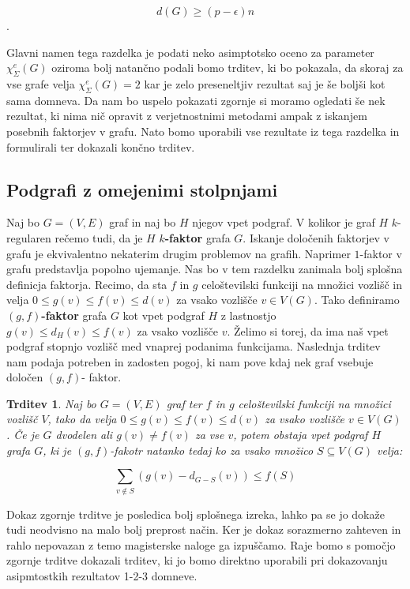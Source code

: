 \documentclass[12pt,a4paper,twoside]{article}
\theoremstyle{definition} %
\theoremstyle{plain} %
\newtheorem{trditev}[definicija]{Trditev}
\newcommand{\ec}{\chi_{\Sigma}^e}
\numberwithin{equation}{section}  %
\begin{document}
$$ d(G) \ge (p - \epsilon)n $$.

Glavni namen tega razdelka je podati neko asimptotsko oceno za parameter $\ec(G)$ oziroma bolj natančno podali bomo trditev, ki bo pokazala, da skoraj za vse grafe velja $\ec(G) = 2$ kar je zelo preseneltjiv rezultat saj je še boljši kot sama domneva. Da nam bo uspelo pokazati zgornje si moramo ogledati še nek rezultat, ki nima nič opravit z verjetnostnimi metodami ampak z iskanjem posebnih faktorjev v grafu. Nato bomo uporabili vse rezultate iz tega razdelka in formulirali ter dokazali končno trditev.

\subsection{Podgrafi z omejenimi stolpnjami}

Naj bo $G =(V, E)$ graf in naj bo $H$ njegov vpet podgraf. V kolikor je graf $H$ $k$-regularen rečemo tudi, da je $H$ \textbf{$k$-faktor} grafa $G$.  Iskanje določenih faktorjev v grafu je ekvivalentno nekaterim drugim problemov na grafih. Naprimer $1$-faktor v grafu predstavlja popolno ujemanje. Nas bo v tem razdelku zanimala bolj splošna definicja faktorja.  Recimo, da sta $f$ in $g$ celoštevilski funkciji na množici vozlišč in velja $0 \le g(v) \le f(v) \le d(v)$ za vsako vozlišče $v \in V(G)$. Tako definiramo \textbf{$(g,f)$-faktor} grafa $G$ kot vpet podgraf $H$ z lastnostjo $g(v) \le d_H(v) \le f(v)$ za vsako vozlišče $v$. Želimo si torej, da ima naš vpet podgraf stopnjo vozlišč med vnaprej podanima funkcijama. Naslednja trditev nam podaja potreben in zadosten pogoj, ki nam pove kdaj nek graf vsebuje določen $(g, f)$- faktor.

 \begin{trditev}
Naj bo $G=(V, E)$ graf ter $f$ in $g$ celoštevilski funkciji na množici vozlišč $V$, tako da velja  $0 \le g(v) \le f(v) \le d(v)$ za vsako vozlišče $v \in V(G)$. Če je $G$ dvodelen ali $g(v) \neq f(v)$ za vse $v$, potem obstaja vpet podgraf $H$ grafa $G$, ki je $(g, f)$-fakotr natanko tedaj ko za vsako množico $S \subseteq V(G)$ velja:

$$\sum_{v \not \in S}(g(v) - d_{G-S}(v)) \le f(S) $$
\end{trditev}

Dokaz zgornje trditve je posledica bolj splošnega izreka, lahko pa se jo dokaže tudi neodvisno na malo bolj preprost način. Ker je dokaz sorazmerno zahteven in rahlo nepovazan z temo magisterske naloge ga izpuščamo. Raje bomo s pomočjo zgornje trditve dokazali trditev, ki jo bomo direktno uporabili pri dokazovanju asipmtostkih rezultatov 1-2-3 domneve.
\end{document}
